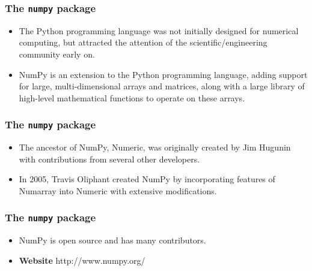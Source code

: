 \documentclass[MASTER.tex]{subfiles}
\begin{document}
\begin{frame}
\frametitle{The \texttt{numpy} package}
\Large
\begin{itemize}
\item The Python programming language was not initially designed for numerical computing, but attracted the attention of the scientific/engineering community early on.

\item NumPy is an extension to the Python programming language, adding support for large, multi-dimensional arrays and matrices, along with a large library of high-level mathematical functions to operate on these arrays. 
\end{itemize}
\end{frame}
\begin{frame}
\frametitle{The \texttt{numpy} package}
\Large	
	
\begin{itemize}
\item The ancestor of NumPy, Numeric, was originally created by Jim Hugunin with contributions from several other developers. 
\item In 2005, Travis Oliphant created NumPy by incorporating features of Numarray into Numeric with extensive modifications. 
\end{itemize}

\end{frame}
\begin{frame}
\frametitle{The \texttt{numpy} package}
\Large	
	
\begin{itemize}
\item NumPy is open source and has many contributors.
\item \textbf{Website} http://www.numpy.org/
\end{itemize}

\end{frame}
\end{document}
